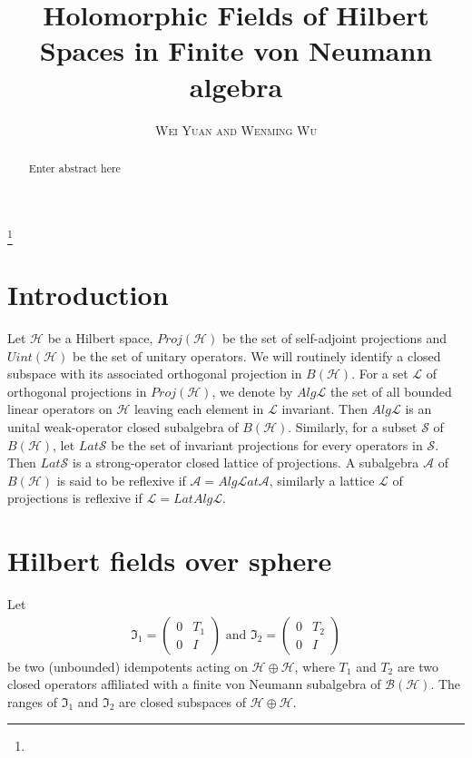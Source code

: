 \documentclass[a4paper,10pt]{amsart}
\newcommand{\BBB}{\mathcal B}
\newcommand{\II}{\mathfrak I}
\newcommand{\HHH}{\mathcal H} %
\newcommand{\LLL}{\mathcal L} %
\newcommand{\Lat}{\mathcal Lat}
\newcommand{\titleinfo}{Holomorphic Fields of Hilbert Spaces 
in Finite von Neumann algebra}
\newcommand{\authorinfo}{Wei Yuan and Wenming Wu}
\begin{document}
\title{\LARGE\textbf{\titleinfo}} 
\author{\large\textsc{\authorinfo}} 
\address{AMSS}  
\email{}

\date{}

\begin{abstract}
Enter abstract here
\end{abstract}

\keywords{}
\thanks{}
\maketitle


\section{Introduction}
Let $\HHH$ be a Hilbert space, $Proj(\HHH)$ be the set of self-adjoint projections
and $Uint(\HHH)$ be the set of unitary operators. We will routinely identify a 
closed subspace with its associated orthogonal projection in $B(\HHH)$.
For a set $\LLL$ of orthogonal projections in $Proj(\HHH)$, we denote by $Alg\LLL$ the set of all bounded linear operators on $\HHH$ leaving each element
in $\LLL$ invariant. Then $Alg\LLL$ is an unital weak-operator closed subalgebra of 
$B(\HHH)$. Similarly, for a subset $\mathcal{S}$ of
$B(\HHH)$, let $Lat\mathcal{S}$ be the set of  invariant projections for every 
operators in $\mathcal{S}$. Then $Lat\mathcal{S}$ is a
strong-operator closed lattice of projections. A subalgebra $\mathcal{A}$ of 
$B(\HHH)$ is said to be reflexive if
$\mathcal{A}=Alg\Lat\mathcal{A}$, similarly a lattice $\LLL$ of projections 
is reflexive if $\LLL=LatAlg\LLL$.

\section{Hilbert fields over sphere}
Let 
\begin{align*}
   \II_1 = \begin{pmatrix}
       0 & T_1 \\
       0 & I
   \end{pmatrix} \mbox{ and }
    \II_2 = \begin{pmatrix}
       0 & T_2 \\
       0 & I
   \end{pmatrix}
\end{align*}
be two (unbounded) idempotents acting on $\HHH \oplus \HHH$, 
where $T_1$ and $T_2$ are two closed operators affiliated with a 
finite von Neumann subalgebra of $\BBB(\HHH)$. 
The ranges of $\II_{1}$ and $\II_{2}$ are closed subspaces of 
$\HHH \oplus \HHH$.
\end{document}
